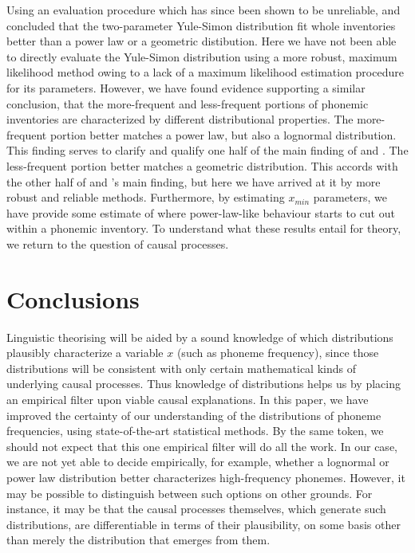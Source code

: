 Using an evaluation procedure which has since been shown to be unreliable, \textcite{martindale_comparison_1996} and \textcite{tambovtsev_phoneme_2007} concluded that the two-parameter Yule-Simon distribution fit whole inventories better than a power law or a geometric distibution. Here we have not been able to directly evaluate the Yule-Simon distribution using a more robust, maximum likelihood method owing to a lack of a maximum likelihood estimation procedure for its parameters. However, we have found evidence supporting a similar conclusion, that the more-frequent and less-frequent portions of phonemic inventories are characterized by different distributional properties. The more-frequent portion better matches a power law, but also a lognormal distribution. This finding serves to clarify and qualify one half of the main finding of \textcite{martindale_comparison_1996} and \textcite{tambovtsev_phoneme_2007}. The less-frequent portion better matches a geometric distribution. This accords with the other half of \textcite{martindale_comparison_1996} and \textcite{tambovtsev_phoneme_2007}'s main finding, but here we have arrived at it by more robust and reliable methods. Furthermore, by estimating \(x_{min}\) parameters, we have provide some estimate of where power-law-like behaviour starts to cut out within a phonemic inventory. To understand what these results entail for theory, we return to the question of causal processes.

\hypertarget{conclusions}{%
\section{Conclusions}\label{conclusions}}

Linguistic theorising will be aided by a sound knowledge of which distributions plausibly characterize a variable \(x\) (such as phoneme frequency), since those distributions will be consistent with only certain mathematical kinds of underlying causal processes. Thus knowledge of distributions helps us by placing an empirical filter upon viable causal explanations. In this paper, we have improved the certainty of our understanding of the distributions of phoneme frequencies, using state-of-the-art statistical methods. By the same token, we should not expect that this one empirical filter will do all the work. In our case, we are not yet able to decide empirically, for example, whether a lognormal or power law distribution better characterizes high-frequency phonemes. However, it may be possible to distinguish between such options on other grounds. For instance, it may be that the causal processes themselves, which generate such distributions, are differentiable in terms of their plausibility, on some basis other than merely the distribution that emerges from them.

